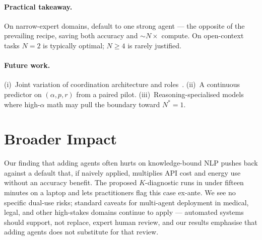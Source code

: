 \documentclass{article}
\begin{document}
\paragraph{Practical takeaway.} On narrow-expert domains, default to one strong agent --- the opposite of the prevailing recipe, saving both accuracy and ${\sim}N{\times}$ compute. On open-context tasks $N{=}2$ is typically optimal; $N{\geq}4$ is rarely justified.

\paragraph{Future work.} (i)~Joint variation of coordination architecture and roles~\citep{google2025scalingagents,du2023multiagentdebate}. (ii)~A continuous predictor on $(\alpha, p, r)$ from a paired pilot. (iii)~Reasoning-specialised models~\citep{deepseek2025r1} where high-$\alpha$ math may pull the boundary toward $N^{*}{=}1$.


\section*{Broader Impact}
\label{sec:broader}

Our finding that adding agents often hurts on knowledge-bound NLP pushes back against a default that, if naively applied, multiplies API cost and energy use without an accuracy benefit. The proposed $K$-diagnostic runs in under fifteen minutes on a laptop and lets practitioners flag this case ex-ante. We see no specific dual-use risks; standard caveats for multi-agent deployment in medical, legal, and other high-stakes domains continue to apply --- automated systems should support, not replace, expert human review, and our results emphasise that adding agents does not substitute for that review.
\end{document}
